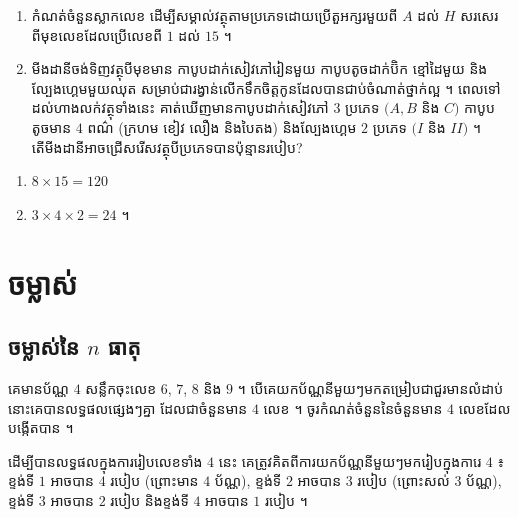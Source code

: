 \begin{pro}
\begin{enumerate}[1]
  \item កំណត់ចំនួនស្លាកលេខ ដើម្បីសម្គាល់វត្ថុតាមប្រភេទដោយប្រើតួអក្សរមួយពី $A$ ដល់ $H$ សរសេរពីមុខលេខដែលប្រើលេខពី $1$ ដល់ $15$ ។
  \item មីងដានីចង់ទិញវត្ថុបីមុខមាន កាបូបដាក់សៀវភៅរៀនមួយ កាបូបតូចដាក់ប៊ិក ខ្មៅដៃមួយ និងល្បែងហ្គេមមួយឈុត សម្រាប់ជារង្វាន់លើកទឹកចិត្តកូនដែលបានជាប់ចំណាត់ថ្នាក់ល្អ ។ ពេលទៅដល់ហាងលក់វត្ថុទាំងនេះ គាត់ឃើញមានកាបូបដាក់សៀវភៅ $3$ ប្រភេទ $(A, B$ និង $C)$ កាបូបតូចមាន $4$ ពណ៌ (ក្រហម ខៀវ លឿង និងបៃតង) និងល្បែងហ្គេម $2$ ប្រភេទ $(I$ និង $II)$ ។ តើមីងដានីអាចជ្រើសរើសវត្ថុបីប្រភេទបានប៉ុន្មានរបៀប?
\end{enumerate}
\ans
\begin{enumerate}[1]
  \item $8\times 15 = 120$
  \item $3\times 4\times 2 = 24$ ។
\end{enumerate}
\end{pro}

\section{ចម្លាស់}
\subsection{ចម្លាស់នៃ \texorpdfstring{$n$}{n} ធាតុ}

\begin{example}[ឧទាហរណ៍]
គេមានប័ណ្ណ $4$ សន្លឹកចុះលេខ $6$, $7$, $8$ និង $9$ ។ បើគេយកប័ណ្ណនីមួយៗមកតម្រៀបជាជួរមានលំដាប់ នោះគេបានលទ្ធផលផ្សេងៗគ្នា ដែលជាចំនួនមាន $4$ លេខ ។ ចូរកំណត់ចំនួននៃចំនួនមាន $4$ លេខដែលបង្កើតបាន ។
\end{example}
ដើម្បីបានលទ្ធផលក្នុងការរៀបលេខទាំង $4$ នេះ គេត្រូវគិតពីការយកប័ណ្ណនីមួយៗមករៀបក្នុងការេ $4$ ៖ ខ្ទង់ទី $1$ អាចបាន $4$ របៀប (ព្រោះមាន $4$ ប័ណ្ណ), ខ្ទង់ទី $2$ អាចបាន $3$ របៀប (ព្រោះសល់ $3$ ប័ណ្ណ), ខ្ទង់ទី $3$ អាចបាន $2$ របៀប និងខ្ទង់ទី $4$ អាចបាន $1$ របៀប ។

\begin{center}
\end{center}

